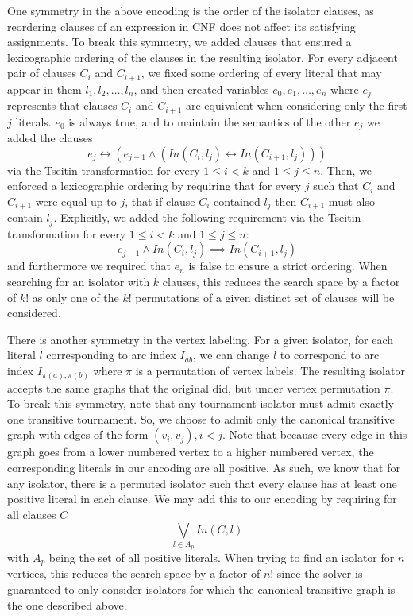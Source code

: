 \documentclass[conference]{IEEEtran}
\begin{document}
One symmetry in the above encoding is the order of the isolator clauses, as reordering clauses of an expression in CNF does not affect its satisfying assignments.  To break this symmetry, we added clauses that ensured a lexicographic ordering of the clauses in the resulting isolator.  For every adjacent pair of clauses $C_i$ and $C_{i+1}$, we fixed some ordering of every literal that may appear in them $l_1, l_2, \dots, l_n$, and then created variables $e_0, e_1, \dots, e_n$ where $e_j$ represents that clauses $C_i$ and $C_{i+1}$ are equivalent when considering only the first $j$ literals.  $e_0$ is always true, and to maintain the semantics of the other $e_j$ we added the clauses
$$e_j \leftrightarrow (e_{j-1} \land (\mathit{In}(C_i, l_j) \leftrightarrow \mathit{In}(C_{i+1}, l_j)))$$
via the Tseitin transformation for every $1 \le i < k$ and $1 \le j\le n$.  Then, we enforced a lexicographic ordering by requiring that for every $j$ such that $C_i$ and $C_{i+1}$ were equal up to $j$, that if clause $C_i$ contained $l_j$ then $C_{i+1}$ must also contain $l_j$.  Explicitly, we added the following requirement via the Tseitin transformation for every $1 \le i < k$ and $1 \le j\le n$:
$$e_{j-1} \land \mathit{In}(C_i, l_j) \implies \mathit{In}(C_{i+1}, l_j)$$
and furthermore we required that $e_n$ is false to ensure a strict ordering.  When searching for an isolator with $k$ clauses, this reduces the search space by a factor of $k!$ as only one of the $k!$ permutations of a given distinct set of clauses will be considered.

There is another symmetry in the vertex labeling.  For a given isolator, for each literal $l$ corresponding to arc index $I_{ab}$, we can change $l$ to correspond to arc index $I_{\pi(a),\pi(b)}$ where $\pi$ is a permutation of vertex labels. The resulting isolator accepts the same graphs that the original did, but under vertex permutation $\pi$.  To break this symmetry, note that any tournament isolator must admit exactly one transitive tournament.  So, we choose to admit only the canonical transitive graph with edges of the form $(v_i, v_j), i < j$.  Note that because every edge in this graph goes from a lower numbered vertex to a higher numbered vertex, the corresponding literals in our encoding are all positive.  As such, we know that for any isolator, there is a permuted isolator such that every clause has at least one positive literal in each clause.  We may add this to our encoding by requiring for all clauses $C$
$$\bigvee_{l \in A_p} \mathit{In}(C, l)$$
with $A_p$ being the set of all positive literals.    When trying to find an isolator for $n$ vertices, this reduces the search space by a factor of $n!$ since the solver is guaranteed to only consider isolators for which the canonical transitive graph is the one described above.
\end{document}
